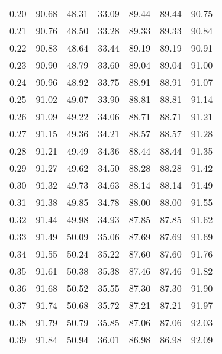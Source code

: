 \begin{tabular}{|c|c|c|c|c|c|c|}
      0.20 &     90.68 &     48.31 &      33.09 &   89.44 &      89.44 &         90.75 \\
      0.21 &     90.76 &     48.50 &      33.28 &   89.33 &      89.33 &         90.84 \\
      0.22 &     90.83 &     48.64 &      33.44 &   89.19 &      89.19 &         90.91 \\
      0.23 &     90.90 &     48.79 &      33.60 &   89.04 &      89.04 &         91.00 \\
      0.24 &     90.96 &     48.92 &      33.75 &   88.91 &      88.91 &         91.07 \\
      0.25 &     91.02 &     49.07 &      33.90 &   88.81 &      88.81 &         91.14 \\
      0.26 &     91.09 &     49.22 &      34.06 &   88.71 &      88.71 &         91.21 \\
      0.27 &     91.15 &     49.36 &      34.21 &   88.57 &      88.57 &         91.28 \\
      0.28 &     91.21 &     49.49 &      34.36 &   88.44 &      88.44 &         91.35 \\
      0.29 &     91.27 &     49.62 &      34.50 &   88.28 &      88.28 &         91.42 \\
      0.30 &     91.32 &     49.73 &      34.63 &   88.14 &      88.14 &         91.49 \\
      0.31 &     91.38 &     49.85 &      34.78 &   88.00 &      88.00 &         91.55 \\
      0.32 &     91.44 &     49.98 &      34.93 &   87.85 &      87.85 &         91.62 \\
      0.33 &     91.49 &     50.09 &      35.06 &   87.69 &      87.69 &         91.69 \\
      0.34 &     91.55 &     50.24 &      35.22 &   87.60 &      87.60 &         91.76 \\
      0.35 &     91.61 &     50.38 &      35.38 &   87.46 &      87.46 &         91.82 \\
      0.36 &     91.68 &     50.52 &      35.55 &   87.30 &      87.30 &         91.90 \\
      0.37 &     91.74 &     50.68 &      35.72 &   87.21 &      87.21 &         91.97 \\
      0.38 &     91.79 &     50.79 &      35.85 &   87.06 &      87.06 &         92.03 \\
      0.39 &     91.84 &     50.94 &      36.01 &   86.98 &      86.98 &         92.09 \\

\end{tabular}
